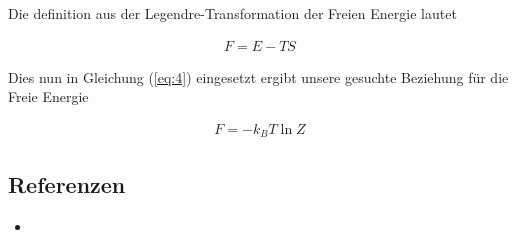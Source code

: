 Die definition aus der Legendre-Transformation der Freien Energie lautet

\begin{align}
  \label{eq:5}
  F = E - TS
\end{align}

Dies nun in Gleichung (\ref{eq:4}) eingesetzt ergibt unsere gesuchte Beziehung für die Freie Energie

\begin{align}
  \label{eq:6}
\boxed{  F =  - k_B T \ln Z }
\end{align}







\subsection*{Referenzen}
\begin{itemize}
\item 
\end{itemize}


